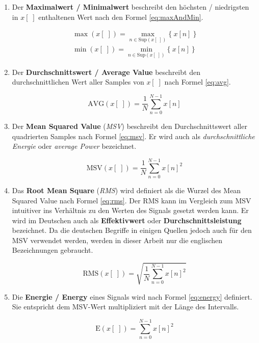 \begin{enumerate}[leftmargin=*]
	
	\item Der \textbf{Maximalwert / Minimalwert} beschreibt den höchsten / niedrigsten in  $x[\;]$ enthaltenen Wert nach den Formel \ref{eq:maxAndMin}.
	
	\begin{equation}
	\begin{gathered}
	\max(x[\;]) = \max\limits_{n \in \text{Sup}(x[\;]) }\{\ x[n]\ \} \\ 
	\min(x[\;])= \min\limits_{n \in \text{Sup}(x[\;])}\{\ x[n]\ \}
	\end{gathered}
	\label{eq:maxAndMin}
	\end{equation}
	
	
	\item Der \textbf{Durchschnittswert / Average Value} beschreibt den durchschnittlichen Wert aller Samples von $x[\;]$ nach Formel \ref{eq:avg}.
	
	\begin{equation}
	\text{AVG}(x[\;]) = \frac{1}{N} \sum_{n = 0}^{N-1} x[n]
	\label{eq:avg}
	\end{equation}
	
	\item Der \textbf{Mean Squared Value} (\emph{MSV}) beschreibt den Durchschnittswert aller quadrierten Samples nach Formel \ref{eq:msv}. Er wird auch als \emph{durchschnittliche Energie} oder \emph{average Power} bezeichnet.
	
	\begin{equation}
	\text{MSV}(x[\;]) = \frac{1}{N} \sum_{n = 0}^{N-1} x[n]^2
	\label{eq:msv}
	\end{equation}
	
	\item Das \textbf{Root Mean Square} (\emph{RMS}) wird definiert als die Wurzel des Mean Squared Value nach Formel \ref{eq:rms}. Der RMS kann im Vergleich zum MSV intuitiver ins Verhältnis zu den Werten des Signals gesetzt werden kann. Er wird im Deutschen auch als \textbf{Effektivwert} oder \textbf{Durchschnittsleistung} bezeichnet. Da die deutschen Begriffe in einigen Quellen jedoch auch für den MSV verwendet werden, werden in dieser Arbeit nur die englischen Bezeichnungen gebraucht.
	
	\begin{equation}
	\text{RMS}(x[\;]) = \sqrt{\frac{1}{N} \sum_{n = 0}^{N-1} x[n]^2}
	\label{eq:rms}
	\end{equation}
	
	\item Die \textbf{Energie / Energy} eines Signals wird nach Formel \ref{eq:energy} definiert. Sie entspricht dem MSV-Wert multipliziert mit der Länge des Intervalls. \cite[S. 27-28]{dspMichigan}
	
	\begin{equation}
	\text{E}(x[\;]) = \sum_{n = 0}^{N-1} x[n]^2
	\label{eq:energy}
	\end{equation}
	
\end{enumerate}	

